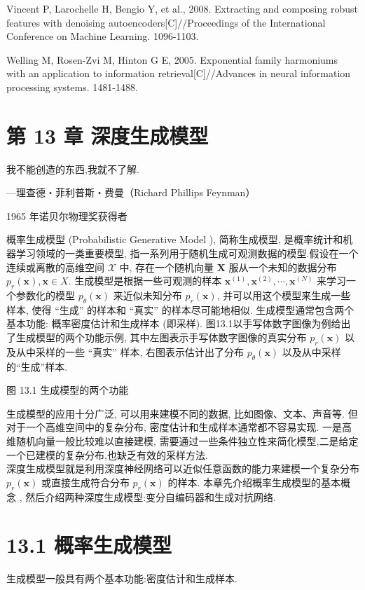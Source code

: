 \documentclass[10pt]{article}
\begin{document}
Vincent P, Larochelle H, Bengio Y, et al., 2008. Extracting and composing robust features with denoising autoencoders[C]//Proceedings of the International Conference on Machine Learning. 1096-1103.

Welling M, Rosen-Zvi M, Hinton G E, 2005. Exponential family harmoniums with an application to information retrieval[C]//Advances in neural information processing systems. 1481-1488.

\section*{第 13 章 深度生成模型}
我不能创造的东西,我就不了解.

—理查德・菲利普斯・费曼（Richard Phillips Feynman）

1965 年诺贝尔物理奖获得者

概率生成模型 (Probabilistic Generative Model ), 简称生成模型, 是概率统计和机器学习领域的一类重要模型, 指一系列用于随机生成可观测数据的模型.假设在一个连续或离散的高维空间 $\mathcal{X}$ 中, 存在一个随机向量 $\boldsymbol{X}$ 服从一个未知的数据分布 $p_{r}(\boldsymbol{x}), \boldsymbol{x} \in X$. 生成模型是根据一些可观测的样本 $\boldsymbol{x}^{(1)}, \boldsymbol{x}^{(2)}, \cdots, \boldsymbol{x}^{(N)}$ 来学习一个参数化的模型 $p_{\theta}(\boldsymbol{x})$ 来近似未知分布 $p_{r}(\boldsymbol{x})$, 并可以用这个模型来生成一些样本, 使得 “生成” 的样本和 “真实” 的样本尽可能地相似. 生成模型通常包含两个基本功能: 概率密度估计和生成样本 (即采样). 图13.1以手写体数字图像为例给出了生成模型的两个功能示例, 其中左图表示手写体数字图像的真实分布 $p_{r}(\boldsymbol{x})$ 以及从中采样的一些 “真实” 样本, 右图表示估计出了分布 $p_{\theta}(\boldsymbol{x})$ 以及从中采样的“生成”样本.



图 13.1 生成模型的两个功能

生成模型的应用十分广泛, 可以用来建模不同的数据, 比如图像、文本、声音等. 但对于一个高维空间中的复杂分布, 密度估计和生成样本通常都不容易实现. 一是高维随机向量一般比较难以直接建模, 需要通过一些条件独立性来简化模型,二是给定一个已建模的复杂分布,也缺乏有效的采样方法.\\
深度生成模型就是利用深度神经网络可以近似任意函数的能力来建模一个复杂分布 $p_{r}(\boldsymbol{x})$ 或直接生成符合分布 $p_{r}(\boldsymbol{x})$ 的样本. 本章先介绍概率生成模型的基本概念 , 然后介绍两种深度生成模型:变分自编码器和生成对抗网络.

\section*{13.1 概率生成模型}
生成模型一般具有两个基本功能:密度估计和生成样本.
\end{document}
